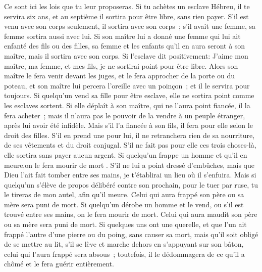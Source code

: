 \begin{multicols}{2}
\VerseOne{}Ce sont ici les lois que tu leur proposeras.
Si tu achètes un esclave Hébreu, il te servira six ans, et au septième il sortira pour être libre, sans rien payer.
S'il est venu avec son corps seulement, il sortira avec son corps~; s'il avait une femme, sa femme sortira aussi avec lui.
Si son maître lui a donné une femme qui lui ait enfanté des fils ou des filles, sa femme et les enfants qu'il en aura seront à son maître, mais il sortira avec son corps.
Si l'esclave dit positivement: J'aime mon maître, ma femme, et mes fils, je ne sortirai point pour être libre.
Alors son maître le fera venir devant les juges, et le fera approcher de la porte ou du poteau, et son maître lui percera l'oreille avec un poinçon~; et il le servira pour toujours.
Si quelqu'un vend sa fille pour être esclave, elle ne sortira point comme les esclaves sortent.
Si elle déplaît à son maître, qui ne l'aura point fiancée, il la fera acheter~; mais il n'aura pas le pouvoir de la vendre à un peuple étranger, après lui avoir été infidèle.
Mais s'il l'a fiancée à son fils, il fera pour elle selon le droit des filles.
S'il en prend une pour lui, il ne retranchera rien de sa nourriture, de ses vêtements et du droit conjugal.
S'il ne fait pas pour elle ces trois choses-là, elle sortira sans payer aucun argent.
Si quelqu'un frappe un homme et qu'il en meure,on le fera mourir de mort .
S'il ne lui a point dressé d'embûches, mais que Dieu l'ait fait tomber entre ses mains, je t'établirai un lieu où il s'enfuira.
Mais si quelqu'un s'élève de propos délibéré contre son prochain, pour le tuer par ruse, tu le tireras de mon autel, afin qu'il meure.
Celui qui aura frappé son père ou sa mère sera puni de mort.
Si quelqu'un dérobe un homme et le vend, ou s'il est trouvé entre ses mains, on le fera mourir de mort.
Celui qui aura maudit son père ou sa mère sera puni de mort.
Si quelques uns ont une querelle, et que l'un ait frappé l'autre d'une pierre ou du poing, sans causer sa mort, mais qu'il soit obligé de se mettre au lit,
s'il se lève et marche dehors en s'appuyant sur son bâton, celui qui l'aura frappé sera absous~; toutefois, il le dédommagera de ce qu'il a chômé et le fera guérir entièrement.

\end{multicols}
